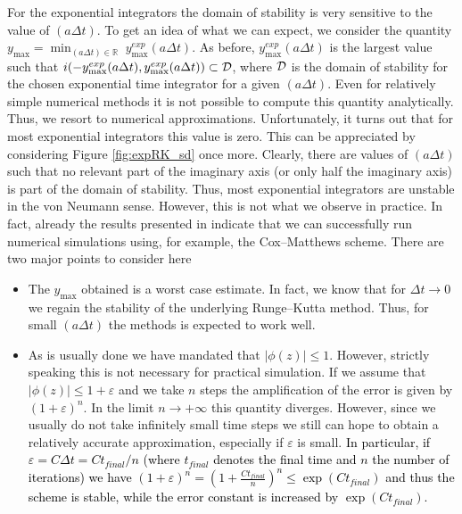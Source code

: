 For the exponential integrators the domain of stability is very sensitive to the value of $(a\Delta t)$. To get an idea of what we can expect, we consider the quantity $y_{\max} = \min_{(a\Delta t)\in\mathbb{R}} \; y^{exp}_{\max}(a \Delta t)$. As before, $y^{exp}_{\max}(a\Delta t)$ is the largest value such that $i(-y^{exp}_{\max}(a\Delta t), y^{exp}_{\max}(a\Delta t))\subset {\cal D}$, where ${\cal D}$ is the domain of stability for the chosen exponential time integrator for a given $(a\Delta t)$. 
Even for relatively simple numerical methods it is not possible to compute this quantity analytically. Thus, we resort to numerical approximations. Unfortunately, it turns out that for most exponential integrators this value is zero. This can be appreciated by considering Figure \ref{fig:expRK_sd} once more. Clearly, there are values of $(a \Delta t)$ such that no relevant part of the imaginary axis (or only half the imaginary axis) is part of the domain of stability.
Thus, most exponential integrators are unstable in the von Neumann sense. However, this is not what we observe in practice. In fact, already the results presented in \cite{cep} indicate that we can successfully run numerical simulations using, for example, the Cox--Matthews scheme. There are two major points to consider here
\begin{itemize}
    \item The $y_{\max}$ obtained is a worst case estimate. In fact, we know that for $\Delta t \to 0$ we regain the stability of the underlying Runge--Kutta method. Thus, for small $(a \Delta t)$ the methods is expected to work well.
    \item As is usually done we have mandated that $\vert \phi(z) \vert \leq 1$. However, strictly speaking this is not necessary for practical simulation. If we assume that $\vert \phi(z) \vert \leq 1+\varepsilon$ and we take $n$ steps the amplification of the error is given by $(1+\varepsilon)^n$. In the limit $n \to +\infty$ this quantity diverges. However, since we usually do not take infinitely small time steps we still can hope to obtain a relatively accurate approximation, especially if $\varepsilon$ is small. \textcolor{black}{In particular, if $\varepsilon = C \Delta t = C t_{final}/n$ (where $t_{final}$ denotes the final time and $n$ the number of iterations) we have $(1+\varepsilon)^n = (1+\tfrac{C t_{final}}{n} )^n \leq \exp(C t_{final})$ and thus the scheme is stable, while the error constant is increased by $\exp(C t_{final})$.}
\end{itemize}


